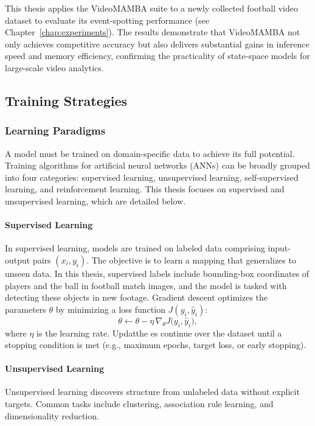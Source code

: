 This thesis applies the VideoMAMBA suite to a newly collected football video dataset to evaluate its event-spotting performance (see Chapter~\ref{chap:experiments}). The results demonstrate that VideoMAMBA not only achieves competitive accuracy but also delivers substantial gains in inference speed and memory efficiency, confirming the practicality of state-space models for large-scale video analytics. 


\subsection{Training Strategies}
\label{ssec:training_stratergies}
\subsubsection{Learning Paradigms}
A model must be trained on domain-specific data to achieve its full potential. Training algorithms for artificial neural networks (ANNs) can be broadly grouped into four categories: supervised learning, unsupervised learning, self-supervised learning, and reinforcement learning. This thesis  focuses on supervised and unsupervised learning, which are detailed below.

\paragraph{Supervised Learning}
In supervised learning, models are trained on labeled data comprising input-output pairs \((x_i, y_i)\). The objective is to learn a mapping that generalizes to unseen data. In this thesis, supervised labels include bounding-box coordinates of players and the ball in football match images, and the model is tasked with detecting these objects in new footage. Gradient descent optimizes the parameters \(\theta\) by minimizing a loss function \(J(y_i, \hat y_i)\):  
\[
\theta \leftarrow \theta - \eta \,\nabla_{\theta}J\bigl(y_i,\hat y_i\bigr),
\]
where \(\eta\) is the learning rate. Updatthe es continue over the dataset until a stopping condition is met (e.g., maximum epochs, target loss, or early stopping).

\paragraph{Unsupervised Learning}
Unsupervised learning discovers structure from unlabeled data without explicit targets. Common tasks include clustering, association rule learning, and dimensionality reduction. 


